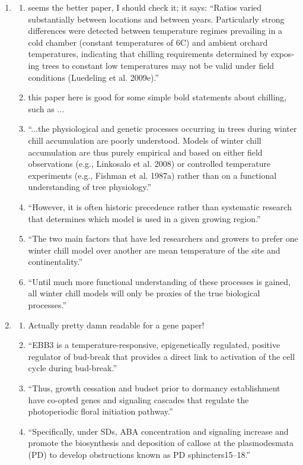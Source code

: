\documentclass[11pt,letter]{article}
\begin{document}
\begin{enumerate}
\begin{enumerate}
\end{enumerate} 
\item \cite{Luedeling:2011qe}
\begin{enumerate} 
\item \cite{Luedeling2009} seems the better paper, I should check it; it says: ``Ratios varied substantially between locations and between years. Particularly strong differences were detected between temperature regimes prevailing in a cold chamber (constant temperatures of 6C) and ambient orchard temperatures, indicating that chilling requirements determined by expos- ing trees to constant low temperatures may not be valid under field conditions (Luedeling et al. 2009e).''
\item this paper here is good for some simple bold statements about chilling, such as ...
\item ``...the physiological and genetic processes occurring in trees during winter chill accumulation are poorly understood. Models of winter chill accumulation are thus purely empirical and based on either field observations (e.g., Linkosalo et al. 2008) or controlled temperature experiments (e.g., Fishman et al. 1987a) rather than on a functional understanding of tree physiology.''
\item ``However, it is often historic precedence rather than systematic research that determines which model is used in a given growing region.''
\item ``The two main factors that have led researchers and growers to prefer one winter chill model over another are mean temperature of the site and continentality.''
\item ``Until much more functional understanding of these processes is gained, all winter chill models will only be proxies of the true biological processes.''
\end{enumerate} 
\item \cite{Azeez2021}
\begin{enumerate} 
\item Actually pretty damn readable for a gene paper!
\item ``EBB3 is a temperature-responsive, epigenetically regulated, positive regulator of bud-break that provides a direct link to activation of the cell cycle during bud-break.''
\item ``Thus, growth cessation and budset prior to dormancy establishment have co-opted genes and signaling cascades that regulate the photoperiodic floral initiation pathway.''
\item ``Specifically, under SDs, ABA concentration and signaling increase and promote the biosynthesis and deposition of callose at the plasmodesmata (PD) to develop obstructions known as PD sphincters15–18.''

\end{enumerate}
\end{enumerate}
\end{document}
